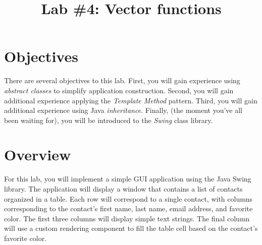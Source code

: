 \documentclass[11pt]{article}
\begin{document}
\title{\vspace{-.35in}Lab \#4: Vector functions}
\date{\empty}
\maketitle

\pagestyle{fancy}
\thispagestyle{fancy}

\vspace{-.75in}
\section{Objectives}
There are several objectives to this lab. First, you will gain experience using
{\em abstract classes} to simplify application construction. Second, you will
gain additional experience applying the {\em Template Method} pattern. Third, you will
gain additional experience using Java {\em inheritance}. Finally, (the moment
you've all been waiting for), you will be introduced to the {\em Swing} class
library.

\section{Overview}
For this lab, you will implement a simple GUI application using the Java Swing
library. The application will display a window that contains a list of contacts
organized in a table. Each row will correspond to a single contact, with
columns corresponding to the contact's first name, last name, email address,
and favorite color. The first three columns will display simple text strings.
The final column will use a custom rendering component to fill the table cell
based on the contact's favorite color.
\end{document}
